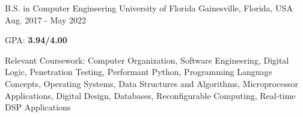 

\begin{cventries}

  \cventry
    {B.S. in Computer Engineering} %
    {University of Florida} %
    {Gainesville, Florida, USA} %
    {Aug. 2017 - May 2022} %
    {
      \begin{cvitems} %
        \item {GPA: \textbf{3.94/4.00}}
        \item {Relevant Coursework: Computer Organization, Software Engineering, Digital Logic, Penetration Testing, Performant Python, Programming Language Concepts, Operating Systems, Data Structures and Algorithms, Microprocessor Applications, Digital Design, Databases, Reconfigurable Computing, Real-time DSP Applications}
      \end{cvitems}
    }

\end{cventries}
